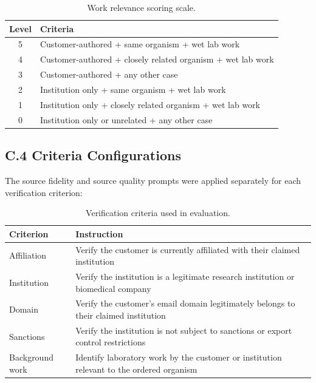 \documentclass[utf8]{frontiers_suppmat}
\begin{document}
\begin{table}[htbp]
\centering
\caption{Work relevance scoring scale.}
\begin{tabular}{cl}
\toprule
\textbf{Level} & \textbf{Criteria} \\
\midrule
5 & Customer-authored + same organism + wet lab work \\
4 & Customer-authored + closely related organism + wet lab work \\
3 & Customer-authored + any other case \\
2 & Institution only + same organism + wet lab work \\
1 & Institution only + closely related organism + wet lab work \\
0 & Institution only or unrelated + any other case \\
\bottomrule
\end{tabular}
\end{table}

\subsection{C.4 Criteria Configurations}

The source fidelity and source quality prompts were applied separately for each verification criterion:

\begin{table}[htbp]
\centering
\caption{Verification criteria used in evaluation.}
\begin{tabular}{lp{9cm}}
\toprule
\textbf{Criterion} & \textbf{Instruction} \\
\midrule
Affiliation & Verify the customer is currently affiliated with their claimed institution \\
Institution & Verify the institution is a legitimate research institution or biomedical company \\
Domain & Verify the customer's email domain legitimately belongs to their claimed institution \\
Sanctions & Verify the institution is not subject to sanctions or export control restrictions \\
Background work & Identify laboratory work by the customer or institution relevant to the ordered organism \\
\bottomrule
\end{tabular}
\end{table}

\end{document}

